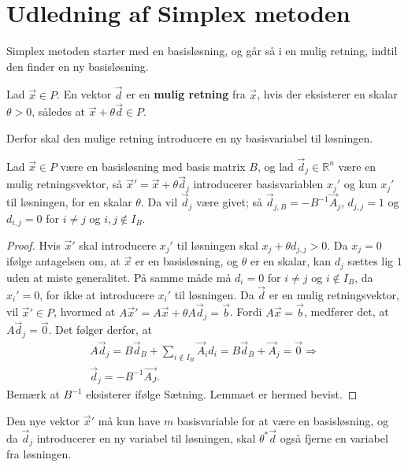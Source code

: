 \section{Udledning af Simplex metoden}
Simplex metoden starter med en basisløsning, og går så i en mulig retning, indtil den finder en ny basisløsning.

\begin{defn}
Lad $\vec{x} \in P$. En vektor $\vec{d}$ er en \textbf{mulig retning} fra $\vec{x}$, hvis der eksisterer en skalar $\theta > 0$, således at $\vec{x}+\theta\vec{d} \in P$.
\end{defn}

Derfor skal den mulige retning introducere en ny basisvariabel til løsningen.

\begin{lma}
Lad $\vec{x} \in P$ være en basisløsning med basis matrix $B$, og lad $\vec{d}_j  \in \mathds{R}^n$ være en mulig retningsvektor, så $\vec{x}' = \vec{x}+ \theta\vec{d}_j$ introducerer basisvariablen $x_j'$ og kun $x_j'$ til løsningen, for en skalar $\theta$.
Da vil $\vec{d}_j$ være givet; så $\vec{d}_{j,B} = -B^{-1}\vec{A}_j$, $d_{j,j} = 1$ og $d_{i,j} = 0$ for $i \neq j$ og $ i,j \notin I_B$.
\label{lma:retningsvektor}
\end{lma}

\begin{proof}
Hvis $\vec{x}'$ skal introducere $x_j'$ til løsningen skal $x_j + \theta d_{j,j} > 0$. 
Da $x_j = 0$ ifølge antagelsen om, at $\vec{x}$ er en basisløsning, og $\theta$ er en skalar, kan $d_j$ sættes lig $1$ uden at miste generalitet. 
På samme måde må $d_i = 0$ for $i \neq j$ og $i \notin I_B$, da $x_i' = 0$, for ikke at introducere $x_i'$ til løsningen.
Da $\vec{d}$ er en mulig retningsvektor, vil $\vec{x}' \in P$, hvormed at $A\vec{x}' = A\vec{x}+ \theta A\vec{d}_j = \vec{b}$. 
Fordi $A\vec{x} = \vec{b}$, medfører det, at $A\vec{d}_j = \vec{0}$.
Det følger derfor, at
\begin{align*}
A\vec{d}_j = B \vec{d}_B + \sum_{i \notin I_B} \vec{A}_id_i = B\vec{d}_B + \vec{A}_j = \vec{0} \Rightarrow
\\ \vec{d}_j = -B^{-1}\vec{A_J}.
\end{align*}
Bemærk at $B^{-1}$ eksisterer ifølge Sætning. 
Lemmaet er hermed bevist.
\end{proof}

Den nye vektor $\vec{x}'$ må kun have $m$ basisvariable for at være en basisløsning, og da $\vec{d}_j$ introducerer en ny variabel til løsningen, skal $\theta^*\vec{d}$ også fjerne en variabel fra  løsningen.

